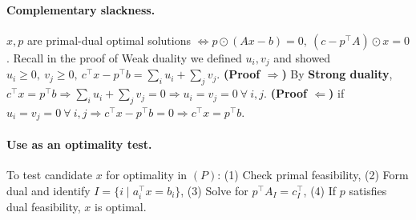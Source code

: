 \documentclass{article}
\begin{document}

\paragraph{Complementary slackness.}
$x,p$ are primal-dual optimal solutions $\iff p \odot (A x - b) = 0,\ (c - p^\top A) \odot x = 0$. Recall in the proof of Weak duality we defined $u_i, v_j$ and showed $u_i \geq 0,\ v_j \geq 0,\ c^\top x-p^\top b = \sum_iu_i + \sum_jv_j$. \textbf{(Proof $\Rightarrow$)} By \textbf{Strong duality}, $c^\top x = p^\top b \Longrightarrow \sum_iu_i + \sum_jv_j = 0 \Longrightarrow u_i = v_j = 0\ \forall\ i,j$. \textbf{(Proof $\Leftarrow$)} if $u_i = v_j = 0\ \forall\ i,j \Longrightarrow c^\top x - p^\top b = 0 \Longrightarrow c^\top x = p^\top b$. 

\paragraph{Use as an optimality test.} To test candidate $x$ for optimality in $(P)$: (1) Check primal feasibility, (2) Form dual and identify $I=\{i\mid a_i^\top x=b_i\}$, (3) Solve for $p^\top A_I = c^\top_I$, (4) If $p$ satisfies dual feasibility, $x$ is optimal.  
\end{document}
